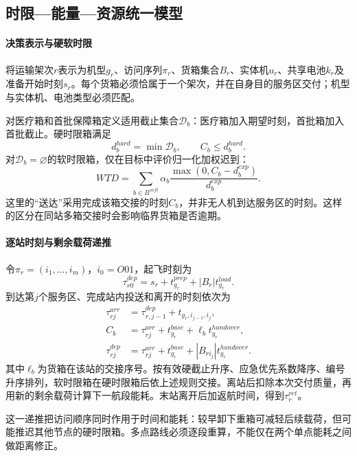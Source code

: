 \subsection{时限—能量—资源统一模型}
\paragraph{决策表示与硬软时限}
将运输架次$r$表示为机型$g_r$、访问序列$\pi_r$、货箱集合$B_r$、实体机$u_r$、共享电池$k_r$及准备开始时刻$s_r$。每个货箱必须恰属于一个架次，并在自身目的服务区交付；机型与实体机、电池类型必须匹配。

对医疗箱和首批保障箱定义适用截止集合$\mathcal D_b$：医疗箱加入期望时刻，首批箱加入首批截止。硬时限箱满足
\begin{equation}d_b^{hard}=\min\mathcal D_b,\qquad C_b\le d_b^{hard}.\end{equation}
对$\mathcal D_b=\varnothing$的软时限箱，仅在目标中评价归一化加权迟到：
\begin{equation}
WTD=\sum_{b\in B^{soft}}\alpha_b\frac{\max(0,C_b-d_b^{exp})}{d_b^{exp}}.\label{eq:wtd}
\end{equation}
这里的“送达”采用完成该箱交接的时刻$C_b$，并非无人机到达服务区的时刻。这样的区分在同站多箱交接时会影响临界货箱是否逾期。

\paragraph{逐站时刻与剩余载荷递推}
令$\pi_r=(i_1,\ldots,i_m)$，$i_0=O01$，起飞时刻为
\begin{equation}\tau_{r0}^{dep}=s_r+t_{g_r}^{prep}+|B_r|t_{g_r}^{load}.\end{equation}
到达第$j$个服务区、完成站内投送和离开的时刻依次为
\begin{align}
\tau_{rj}^{arr}&=\tau_{r,j-1}^{dep}+t_{g_r,i_{j-1},i_j},\\
C_b&=\tau_{rj}^{arr}+t_{g_r}^{base}+\ell_b t_{g_r}^{handover},\\
\tau_{rj}^{dep}&=\tau_{rj}^{arr}+t_{g_r}^{base}+|B_{ri_j}|t_{g_r}^{handover}.
\end{align}
其中$\ell_b$为货箱在该站的交接序号。按有效硬截止升序、应急优先系数降序、编号升序排列，软时限箱在硬时限箱后依上述规则交接。离站后扣除本次交付质量，再用新的剩余载荷计算下一航段能耗。末站离开后加返航时间，得到$\tau_r^{ret}$。

这一递推把访问顺序同时作用于时间和能耗：较早卸下重箱可减轻后续载荷，但可能推迟其他节点的硬时限箱。多点路线必须逐段重算，不能仅在两个单点能耗之间做距离修正。

